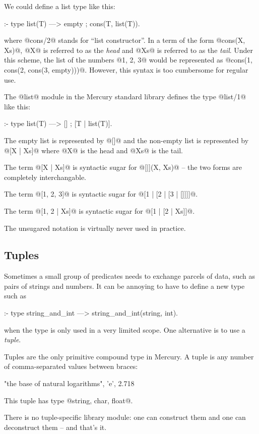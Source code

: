 We could define a list type like this:
\begin{myverbatim}
:- type list(T) ---> empty ; cons(T, list(T)).
\end{myverbatim}
where @cons/2@ stands for ``list constructor''.  In a term of the form
@cons(X, Xs)@, @X@ is referred to as the \emph{head} and @Xs@ is referred to
as the \emph{tail}.  Under this scheme, the list of the numbers @1, 2, 3@
would be represented as @cons(1, cons(2, cons(3, empty)))@.  However, this
syntax is too cumbersome for regular use.

The @list@ module in the Mercury standard library defines the type @list/1@
like this:
\begin{myverbatim}
:- type list(T) ---> [] ; [T | list(T)].
\end{myverbatim}
The empty list is represented by @[]@ and the non-empty list is represented
by @[X | Xs]@ where @X@ is the head and @Xs@ is the tail.

The term @[X | Xs]@ is syntactic sugar for @[|](X, Xs)@ -- the two forms are
completely interchangable.

The term @[1, 2, 3]@ is syntactic sugar for @[1 | [2 | [3 | []]]]@.

The term @[1, 2 | Xs]@ is syntactic sugar for @[1 | [2 | Xs]]@.

The unsugared notation is virtually never used in practice.

\subsection{Tuples}

Sometimes a small group of predicates needs to exchange parcels of data, such
as pairs of strings and numbers.  It can be annoying to have to define a new
type such as
\begin{myverbatim}
:- type string_and_int ---> string_and_int(string, int).
\end{myverbatim}
when the type is only used in a very limited scope.  One alternative is to
use a \emph{tuple}.

Tuples are the only primitive compound type in Mercury.  A tuple is any
number of comma-separated values between braces:
\begin{myverbatim}
    {"the base of natural logarithms", 'e', 2.718}
\end{myverbatim}
This tuple has type @{string, char, float}@.

There is no tuple-specific library module: one can construct them and
one can deconstruct them -- and that's it.

